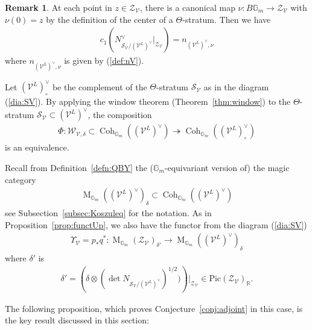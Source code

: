 \documentclass [11pt,oneside,a4paper,mathscr]{amsart}
\theoremstyle{definition}
\newtheorem{remark}[thm]{Remark}
\newcommand{\sS}{\mathcal{S}}
\newcommand{\zZ}{\mathcal{Z}}
\newcommand{\V}{\mathcal{V}}
\newcommand{\MM}{\operatorname{M}}
\newcommand{\bgm}{B\mathbb{G}_m}
\newcommand{\Coh}{\operatorname{Coh}}
\begin{document}
\begin{remark}\label{rmk:nsv}
At each point in $z\in \zZ_{\V}$, there is a canonical map $\nu \colon \bgm \to \zZ_{\V}$
with $\nu(0)=z$ 
by the definition of the center of a $\Theta$-stratum. 
Then we have 
\begin{align*}
    c_1 (N_{\sS_{\V}/(\V^L)^{\vee}}^{\vee}|_{\zZ_{\V}})=n_{(\V^L)^{\vee}, \nu} 
\end{align*}
where $n_{(\V^L)^{\vee}, \nu}$ is given by (\ref{def:nV}). 
    \end{remark}
Let $(\V^L)_{\circ}^{\vee}$ be the complement of the $\Theta$-stratum 
$\mathcal{S}_{\mathcal{V}}$
as in the diagram (\ref{dia:SV}). 
By applying the window theorem (Theorem~\ref{thm:window}) to the $\Theta$-stratum $\mathcal{S}_{\mathcal{V}}\subset (\mathcal{V}^L)^{\vee}$, 
the composition 
\begin{align}\label{comp:func}
\Phi \colon 
    \mathcal{W}_{\V, \delta} \subset \Coh_{\mathbb{G}_m}((\V^L)^{\vee}) \twoheadrightarrow 
    \Coh_{\mathbb{G}_m}((\V^L)^{\vee}_{\circ})
\end{align}
is an equivalence.

Recall from Definition~\ref{defn:QBY} the ($\mathbb{G}_m$-equivariant version of) the magic category 
\begin{align*}
    \MM_{\mathbb{G}_m}((\V^L)^{\vee})_{\delta} \subset \Coh_{\mathbb{G}_m}((\V^L)^{\vee})
\end{align*}
see Subsection~\ref{subsec:Koszuleq} for the notation. 
As in Proposition~\ref{prop:functUp}, we 
also have the functor from the diagram (\ref{dia:SV})
\begin{align}\label{funct:UpM}
    \Upsilon_{\V}=p_{\ast}q^{\ast} \colon \MM_{\mathbb{G}_m}(\zZ_{\V})_{\delta'} \to \MM_{\mathbb{G}_m}((\V^L)^{\vee})_{\delta}
\end{align}
where $\delta'$ is 
\begin{align*}
    \delta'=\left(\delta\otimes (\det N_{\sS_{\V}/(\V^L)^{\vee}})^{1/2})\right)|_{\zZ_{\mathcal{V}}} \in \mathrm{Pic}(\zZ_{\V})_{\mathbb{R}}. 
\end{align*}

The following proposition, which proves Conjecture~\ref{conj:adjoint} in this case, is 
the key result discussed in this section: 
\end{document}

